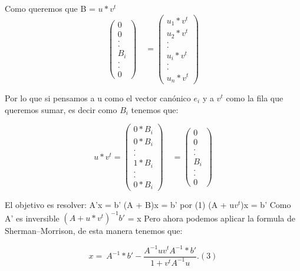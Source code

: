 Como queremos que B = $u*v^t$
$$
\begin{pmatrix} 
0\\
0\\
.\\
.\\
B_i\\
.\\
.\\
0
\end{pmatrix}
\quad
=
\begin{pmatrix} 
u_1*v^t\\
u_2*v^t\\
.\\
.\\
u_i*v^t\\
.\\
.\\
u_n*v^t
\end{pmatrix}
$$

Por lo que si pensamos a u como el vector canónico $e_i$ y a $v^t$ como la fila que queremos sumar, es decir como $B_i$ tenemos que:


$$
u*v^t=
\begin{pmatrix} 
0*B_i\\
0*B_i\\
.\\
.\\
1*B_i\\
.\\
.\\
0*B_i
\end{pmatrix}
\quad 
=
\begin{pmatrix} 
0\\
0\\
.\\
.\\
B_i\\
.\\
.\\
0
\end{pmatrix}
$$

El objetivo es resolver:\newline
A'x = b'\newline 
(A + B)x = b' por (1) \newline
(A + u$v^t$)x  = b'\newline
Como A' es inversible
$(A + u*v^t)^{-1}b'$ = x\newline
Pero ahora podemos aplicar la formula de Sherman–Morrison, de esta manera tenemos que: 

\begin{equation}
x =\ A^{-1}*b' - \frac{ A^{-1} u v^t A^{-1}*b'}{1+v^t A^{-1}u}.\label{eq:sm}(3)
\end{equation} 

